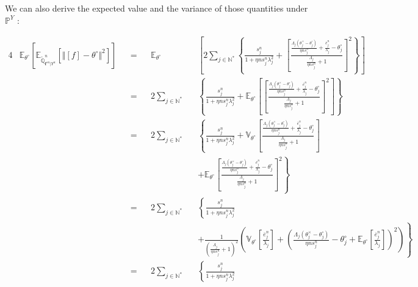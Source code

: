 We can also derive the expected value and the variance of those quantities under $\mathds{P}^{Y}$ :

\begin{alignat*}{4}
& \mathds{E}_{\theta^{\circ}}\left[\mathds{E}_{\widetilde{\mathds{Q}}_{\boldsymbol{f}^{s{n}} \vert Y^{n}}^{n}}\left[\Vert [f] - \theta^{\circ} \Vert^{2}\right]\right] &&=&& \mathds{E}_{\theta^{\circ}}&&\left[2 \sum\limits_{j \in \mathds{N^{*}}} \left\{\frac{s_{j}^{n}}{1 + \eta n s_{j}^{n} \lambda_{j}^{2}} + \left[\frac{\frac{\Lambda_{j}\left(\theta^{\times}_{j} - \theta^{\circ}_{j}\right)}{\eta n s_{j}^{n}} + \frac{\overline{e}_{j}^{n}}{\lambda_{j}}- \theta^{\circ}_{j}}{\frac{\Lambda_{j}}{\eta n s_{j}^{n}} + 1}\right]^{2}\right\}\right]\\
& &&=&& 2 \sum\limits_{j \in \mathds{N^{*}}}&&\left\{ \frac{s_{j}^{n}}{1 + \eta n s_{j}^{n} \lambda_{j}^{2}} + \mathds{E}_{\theta^{\circ}}\left[ \left[\frac{\frac{\Lambda_{j}\left(\theta^{\times}_{j} - \theta^{\circ}_{j}\right)}{\eta n s_{j}^{n}} + \frac{\overline{e}_{j}^{n}}{\lambda_{j}}- \theta^{\circ}_{j}}{\frac{\Lambda_{j}}{\eta n s_{j}^{n}} + 1}\right]^{2}\right]\right\}\\
& &&=&& 2 \sum\limits_{j \in \mathds{N^{*}}}&&\left\{ \frac{s_{j}^{n}}{1 + \eta n s_{j}^{n} \lambda_{j}^{2}} + \mathds{V}_{\theta^{\circ}}\left[\frac{\frac{\Lambda_{j}\left(\theta^{\times}_{j} - \theta^{\circ}_{j}\right)}{\eta n s_{j}^{n}} + \frac{\overline{e}_{j}^{n}}{\lambda_{j}}- \theta^{\circ}_{j}}{\frac{\Lambda_{j}}{\eta n s_{j}^{n}} + 1}\right] \right.\\
& && && && \left.+ \mathds{E}_{\theta^{\circ}}\left[\frac{\frac{\Lambda_{j}\left(\theta^{\times}_{j} - \theta^{\circ}_{j}\right)}{\eta n s_{j}^{n}} + \frac{\overline{e}_{j}^{n}}{\lambda_{j}}- \theta^{\circ}_{j}}{\frac{\Lambda_{j}}{\eta n s_{j}^{n}} + 1}\right]^{2}\right\}\\
& &&=&& 2 \sum\limits_{j \in \mathds{N^{*}}}&&\left\{ \frac{s_{j}^{n}}{1 + \eta n s_{j}^{n} \lambda_{j}^{2}} \right.\\
& && && && \left.+ \frac{1}{\left(\frac{\Lambda_{j}}{\eta n s_{j}^{n}} + 1\right)^{2}}\left(\mathds{V}_{\theta^{\circ}}\left[\frac{\overline{e}_{j}^{n}}{\lambda_{j}}\right] + \left(\frac{\Lambda_{j}\left(\theta^{\times}_{j} - \theta^{\circ}_{j}\right)}{\eta n s_{j}^{n}} - \theta^{\circ}_{j} + \mathds{E}_{\theta^{\circ}}\left[\frac{\overline{e}_{j}^{n}}{\lambda_{j}}\right]\right)^{2}\right)\right\}\\
& &&=&& 2 \sum\limits_{j \in \mathds{N^{*}}}&&\left\{ \frac{s_{j}^{n}}{1 + \eta n s_{j}^{n} \lambda_{j}^{2}} \right.\\

\end{alignat*}
